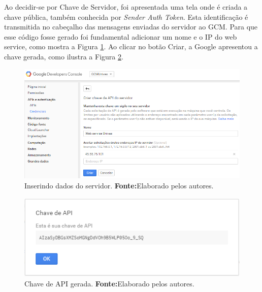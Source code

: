 	\pagebreak
	
	\par Ao decidir-se por Chave de Servidor, foi apresentada uma tela onde é
criada a chave pública, também conhecida por \textit{Sender Auth Token}. Esta
identificação é transmitida no cabeçalho das mensagens enviadas do servidor ao
GCM. Para que esse código fosse gerado foi fundamental adicionar um nome e o IP
do web service, como mostra a Figura \ref{fig:gcm8}. Ao clicar no botão Criar, a
Google apresentou a chave gerada, como ilustra a Figura \ref{fig:gcm9}.
	
	\begin{figure}[h!] 
		\centerline{\includegraphics[scale=0.6]{./imagens/2_q_metodologico/4_procedimentos_resultados/41_gcm/gcm8.png}}
		\caption[Inserindo dados do servidor]{Inserindo dados do servidor.
		\textbf{Fonte:}Elaborado pelos autores.}
		\label{fig:gcm8}
	\end{figure}
	
	\begin{figure}[h!] 
		\centerline{\includegraphics[scale=1]{./imagens/2_q_metodologico/4_procedimentos_resultados/41_gcm/gcm9.png}}
		\caption[Chave de API gerada]{Chave de API gerada.
		\textbf{Fonte:}Elaborado pelos autores.}
		\label{fig:gcm9}
	\end{figure}
	
	\pagebreak
	